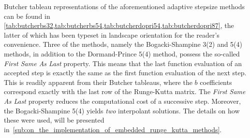 Butcher tableau representations of the aforementioned adaptive stepsize methods
can be found in
\cref{tab:butcherbs32,tab:butcherbs54,tab:butcherdopri54,tab:butcherdopri87},
the latter of which has been typeset in landscape orientation for the reader's
convenience. Three of the methods, namely the Bogacki-Shampine 3(2) and 5(4)
methods, in addition to the Dormand-Prince 5(4) method, possess the so-called
\emph{First Same As Last} property. This means that the last function evaluation
of an accepted step is exactly the same as the first function evaluation of the
next step. This is readily apparent from their Butcher tableaus, where the
$b$ coefficients correspond exactly with the last row of the Runge-Kutta matrix.
The \emph{First Same As Last} property reduces the computational
cost of a successive step. Moreover, the Bogacki-Shampine 5(4) yields \emph{two}
interpolant solutions. The details on how these were used, will be presented
in~\cref{sub:on_the_implementation_of_embedded_runge_kutta_methods}.








\clearpage

